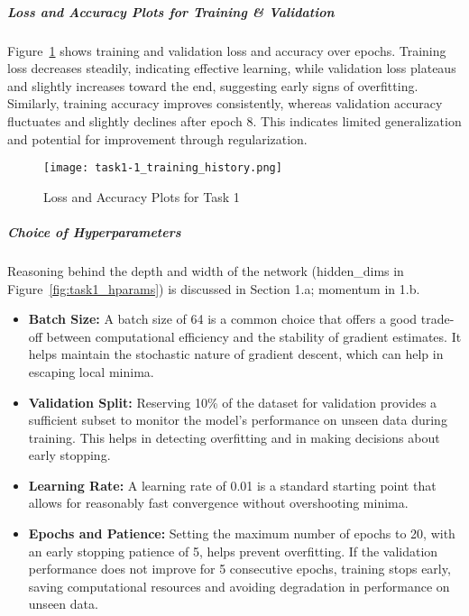 \documentclass[10pt,a4paper,twoside]{article}
\begin{document}
\subparagraph{Loss and Accuracy Plots for Training \& Validation}
Figure~\ref{fig:task1_training} shows training and validation loss and accuracy over epochs. Training loss decreases steadily, indicating effective learning, while validation loss plateaus and slightly increases toward the end, suggesting early signs of overfitting. Similarly, training accuracy improves consistently, whereas validation accuracy fluctuates and slightly declines after epoch 8. This indicates limited generalization and potential for improvement through regularization.

\begin{figure}[h]
    \centering
    \texttt{[image: task1-1\_training\_history.png]} 
    \caption{Loss and Accuracy Plots for Task 1}
    \label{fig:task1_training}
\end{figure}

\subparagraph{Choice of Hyperparameters}
Reasoning behind the depth and width of the network (hidden\_dims in Figure~\ref{fig:task1_hparams}) is discussed in Section 1.a; momentum in 1.b.

\begin{itemize}
    \item \textbf{Batch Size:} A batch size of 64 is a common choice that offers a good trade-off between computational efficiency and the stability of gradient estimates. It helps maintain the stochastic nature of gradient descent, which can help in escaping local minima.

    \item \textbf{Validation Split:} Reserving 10\% of the dataset for validation provides a sufficient subset to monitor the model's performance on unseen data during training. This helps in detecting overfitting and in making decisions about early stopping.

    \item \textbf{Learning Rate:} A learning rate of 0.01 is a standard starting point that allows for reasonably fast convergence without overshooting minima.

    \item \textbf{Epochs and Patience:} Setting the maximum number of epochs to 20, with an early stopping patience of 5, helps prevent overfitting. If the validation performance does not improve for 5 consecutive epochs, training stops early, saving computational resources and avoiding degradation in performance on unseen data.
\end{itemize}
\end{document}
